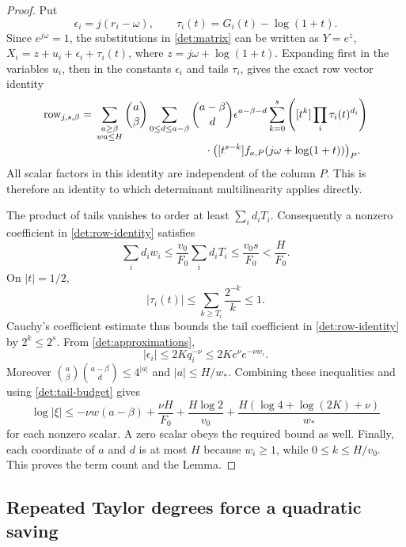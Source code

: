 \begin{proof}
Put
\[
 \epsilon_i=j(r_i-\omega),\qquad
 \tau_i(t)=G_i(t)-\log(1+t).
\]
Since $e^{j\omega}=1$, the substitutions in \eqref{det:matrix} can be
written as $Y=e^z$, $X_i=z+u_i+\epsilon_i+\tau_i(t)$, where
$z=j\omega+\log(1+t)$.  Expanding first in the variables $u_i$, then
in the constants $\epsilon_i$ and tails $\tau_i$, gives the exact row
vector identity
\begin{align}
 \text{row}_{j,s,\beta}
 ={}&\sum_{\substack{a\ge\beta\\wa\le H}}
       \binom a\beta
       \sum_{0\le d\le a-\beta}\binom{a-\beta}{d}
       \epsilon^{a-\beta-d}
       \sum_{k=0}^s
       \left([t^k]\prod_i\tau_i(t)^{d_i}\right)
 \nonumber\\[-2pt]
 &\hspace{35mm}\cdot
 \bigl([t^{s-k}]f_{a,P}(j\omega+\log(1+t))\bigr)_P.
 \label{det:row-identity}
\end{align}
All scalar factors in this identity are independent of the column
$P$.  This is therefore an identity to which determinant
multilinearity applies directly.

The product of tails vanishes to order at least $\sum_i d_iT_i$.
Consequently a nonzero coefficient in \eqref{det:row-identity}
satisfies
\begin{equation}
 \sum_i d_iw_i\le\frac{v_0}{F_0}\sum_i d_iT_i
 \le\frac{v_0s}{F_0}<\frac{H}{F_0}.
 \label{det:tail-budget}
\end{equation}
On $|t|=1/2$,
\[
 |\tau_i(t)|
 \le\sum_{k\ge T_i}\frac{2^{-k}}k\le1.
\]
Cauchy's coefficient estimate thus bounds the tail coefficient in
\eqref{det:row-identity} by $2^k\le2^s$.  From
\eqref{det:approximations},
\[
 |\epsilon_i|\le2Kq_i^{-\nu}
 \le2K e^\nu e^{-\nu w_i}.
\]
Moreover
$\binom a\beta\binom{a-\beta}{d}\le4^{|a|}$ and
$|a|\le H/w_*$.  Combining these inequalities and using
\eqref{det:tail-budget} gives
\[
 \log|\xi|
 \le-\nu w(a-\beta)+\frac{\nu H}{F_0}
       +\frac{H\log2}{v_0}
       +\frac{H(\log4+\log(2K)+\nu)}{w_*}
\]
for each nonzero scalar.  A zero scalar obeys the required bound as
well.  Finally, each coordinate of $a$ and $d$ is at most $H$ because
$w_i\ge1$, while $0\le k\le H/v_0$.  This proves the term count and
the Lemma.
\end{proof}

\subsection{Repeated Taylor degrees force a quadratic saving}

